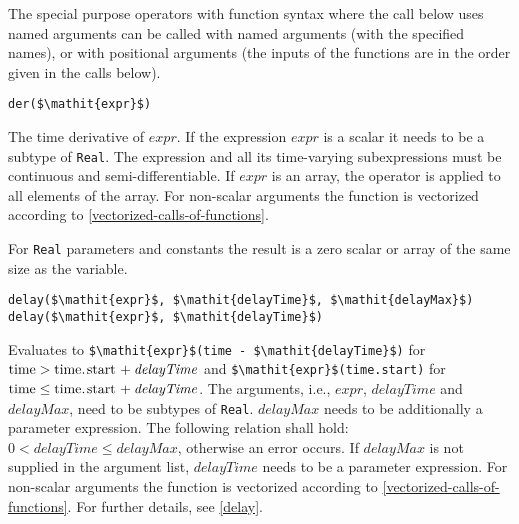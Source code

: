 The special purpose operators with function syntax where the call below uses named arguments can be called with named arguments (with the specified names), or with positional arguments (the inputs of the functions are in the order given in the calls below).

\begin{operatordefinition}[der]
\begin{synopsis}\begin{lstlisting}
der($\mathit{expr}$)
\end{lstlisting}\end{synopsis}
\begin{semantics}
The time derivative of $\mathit{expr}$.
If the expression $\mathit{expr}$ is a scalar it needs to be a subtype of \lstinline!Real!.
The expression and all its time-varying subexpressions must be continuous and semi-differentiable.
If $\mathit{expr}$ is an array, the operator is applied to all elements of the array.
For non-scalar arguments the function is vectorized according to \cref{vectorized-calls-of-functions}.
\begin{nonnormative}
For \lstinline!Real! parameters and constants the result is a zero scalar or array of the same size as the variable.
\end{nonnormative}
\end{semantics}
\end{operatordefinition}

\begin{operatordefinition}[delay]
\begin{synopsis}\begin{lstlisting}
delay($\mathit{expr}$, $\mathit{delayTime}$, $\mathit{delayMax}$)
delay($\mathit{expr}$, $\mathit{delayTime}$)
\end{lstlisting}\end{synopsis}
\begin{semantics}
Evaluates to \lstinline!$\mathit{expr}$(time - $\mathit{delayTime}$)! for $\text{\lstinline!time!} > \text{\lstinline!time.start!} + \mathit{delayTime}$ and \lstinline!$\mathit{expr}$(time.start)! for $\text{\lstinline!time!} \leq \text{\lstinline!time.start!} + \mathit{delayTime}$.
The arguments, i.e., $\mathit{expr}$, $\mathit{delayTime}$ and $\mathit{delayMax}$, need to be subtypes of \lstinline!Real!.
$\mathit{delayMax}$ needs to be additionally a parameter expression.
The following relation shall hold: $0 < \mathit{delayTime} \leq \mathit{delayMax}$, otherwise an error occurs.
If $\mathit{delayMax}$ is not supplied in the argument list, $\mathit{delayTime}$ needs to be a parameter expression.
For non-scalar arguments the function is vectorized according to \cref{vectorized-calls-of-functions}.
For further details, see \cref{delay}.
\end{semantics}
\end{operatordefinition}

